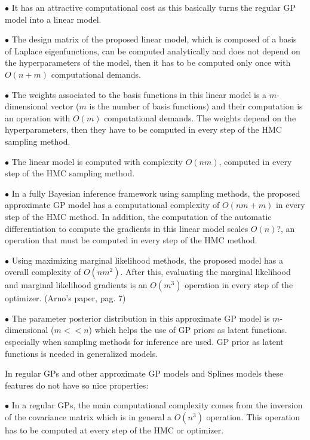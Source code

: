 \documentclass[]{interact}
\theoremstyle{plain}%
\theoremstyle{definition}
\theoremstyle{remark}
\begin{document}
\vspace{2mm}
$\bullet$ It has an attractive computational cost as this basically turns the regular GP model into a linear model.

\vspace{2mm}
$\bullet$ The design matrix of the proposed linear model, which is composed of a basis of Laplace eigenfunctions, can be computed analytically and does not depend on the hyperparameters of the model, then it has to be computed only once with $O(n+m)$ computational demands.

\vspace{2mm}
$\bullet$ The weights associated to the basis functions in this linear model is a $m$-dimensional vector ($m$ is the number of basis functions) and their computation is an operation with $O(m)$ computational demands. The weights depend on the hyperparameters, then they have to be computed in every step of the HMC sampling method.

\vspace{2mm}
$\bullet$ The linear model is computed with complexity $O(nm)$, computed in every step of the HMC sampling method.

\vspace{2mm}
$\bullet$ In a fully Bayesian inference framework using sampling methods, the proposed approximate GP model has a computational complexity of $O(nm+m)$ in every step of the HMC method. In addition, the computation of the automatic differentiation to compute the gradients in this linear model scales $O(n)$?, an operation that must be computed in every step of the HMC method.

\vspace{2mm}
$\bullet$ Using maximizing marginal likelihood methods, the proposed model has a overall complexity of $O(nm^2)$. After this, evaluating the marginal likelihood and marginal likelihood gradients is an $O(m^3)$ operation in every step of the optimizer. (Arno's paper, pag. 7)

\vspace{2mm}
$\bullet$ The parameter posterior distribution in this approximate GP model is $m$-dimensional ($m<<n$) which helps the use of GP priors as latent functions. especially when sampling methods for inference are used. GP prior as latent functions is needed in generalized models.

In regular GPs and other approximate GP models and Splines models these features do not have so nice properties:

\vspace{2mm}
$\bullet$ In a regular GPs, the main computational complexity comes from the inversion of the covariance matrix which is in general a $O(n^3)$ operation. This operation has to be computed at every step of the HMC or optimizer.
\end{document}
